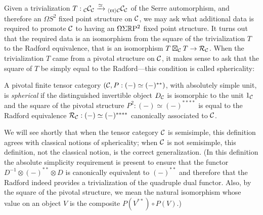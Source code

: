 \documentclass{amsart}
\begin{document}
Given a trivialization $T: {}_\mathcal C \mathcal C_\mathcal C \xrightarrow{\simeq} {}_{\langle \mathfrak{r r} \rangle \mathcal C} \mathcal C_\mathcal C$ of the Serre automorphism, and therefore an $\Omega S^2$ fixed point structure on $\mathcal C$, we may ask what additional data is required to promote $\mathcal C$ to having an $\Omega \Sigma \mathbb R \mathrm{P}^2$ fixed point structure.  It turns out that the required data is an isomorphism from the square of the trivialization $T$ to the Radford equivalence, that is an isomorphism $T \boxtimes_\mathcal C T \rightarrow \mathcal R_\mathcal C$.  When the trivialization $T$ came from a pivotal structure on $\mathcal C$, it makes sense to ask that the square of $T$ be simply equal to the Radford---this condition is called sphericality:
\begin{definition} \label{def:spherical}
A pivotal finite tensor category $(\mathcal C, P: (-) \simeq (-)^{**})$, with absolutely simple unit, is \emph{spherical} if the distinguished invertible object $D_\mathcal C$ is isomorphic to the unit $1_\mathcal C$ and the square of the pivotal structure $P^2: (-) \simeq (-)^{****}$ is equal to the Radford equivalence $\mathcal R_\mathcal C: (-) \simeq (-)^{****}$ canonically associated to $\mathcal C$.
\end{definition}
\nid We will see shortly that when the tensor category $\mathcal C$ is semisimple, this definition agrees with classical notions of sphericality; when $\mathcal C$ is not semisimple, this definition, not the classical notion, is the correct generalization.  (In this definition the absolute simplicity requirement is present to ensure that the functor $D^{-1} \otimes (-)^{**} \otimes D$ is canonically equivalent to $(-)^{**}$ and therefore that the Radford indeed provides a trivialization of the quadruple dual functor.  Also, by the square of the pivotal structure, we mean the natural isomorphism whose value on an object $V$ is the composite $P(V^{**}) \circ P(V)$.)  
\end{document}
